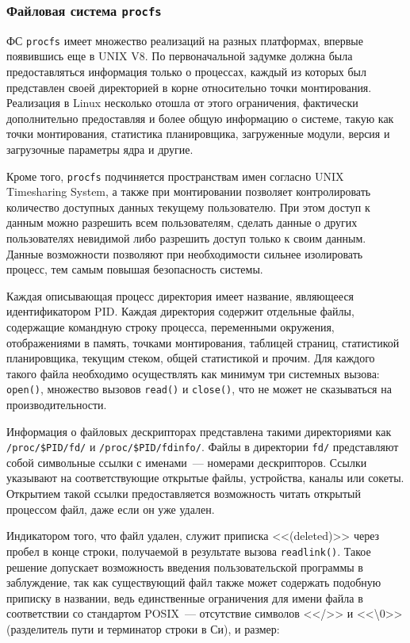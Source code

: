 \subsubsection{Файловая система \texttt{procfs}}
\label{sub:domain:analogs:procfs}

ФС \texttt{procfs} имеет множество реализаций на разных платформах, впервые
появившись еще в UNIX V8. По первоначальной задумке должна была предоставляться
информация только о процессах, каждый из которых был представлен своей
директорией в корне относительно точки монтирования. Реализация в Linux
несколько отошла от этого ограничения, фактически дополнительно предоставляя и
более общую информацию о системе, такую как точки монтирования, статистика
планировщика, загруженные модули, версия и загрузочные параметры ядра и
другие\cite{rlove}.

Кроме того, \texttt{procfs} подчиняется пространствам имен согласно UNIX
Timesharing System, а также при монтировании позволяет контролировать количество
доступных данных текущему пользователю. При этом доступ к данным можно разрешить
всем пользователям, сделать данные о других пользователях невидимой либо
разрешить доступ только к своим данным. Данные возможности позволяют при
необходимости сильнее изолировать процесс, тем самым повышая безопасность
системы.

Каждая описывающая процесс директория имеет название, являющееся идентификатором
PID\cite{understanding}. Каждая директория содержит отдельные файлы, содержащие
командную строку 
процесса, переменными окружения, отображениями в память, точками монтирования,
таблицей страниц, статистикой планировщика, текущим стеком, общей статистикой и
прочим. Для каждого такого файла необходимо осуществлять как минимум три
системных вызова: \texttt{open()}, множество вызовов \texttt{read()} и
\texttt{close()}, что не может не сказываться на производительности.

Информация о файловых дескрипторах представлена такими директориями как
\texttt{/proc/\$PID/fd/} и \texttt{/proc/\$PID/fdinfo/}. Файлы в директории
\texttt{fd/} представляют собой символьные ссылки с именами~---
номерами дескрипторов. Ссылки указывают на соответствующие открытые файлы,
устройства, каналы или сокеты. Открытием такой ссылки предоставляется
возможность читать открытый процессом файл, даже если он уже удален.

Индикатором
того, что файл удален, служит приписка <<(deleted)>> через пробел в конце
строки, получаемой в результате вызова \texttt{readlink()}. Такое решение
допускает возможность введения пользовательской программы в заблуждение, так как
существующий файл также может содержать подобную приписку в названии, ведь
единственные ограничения для имени файла в соответствии со стандартом POSIX~---
отсутствие символов <</>> и <<\textbackslash0>> (разделитель пути и терминатор
строки в Си), и размер:

